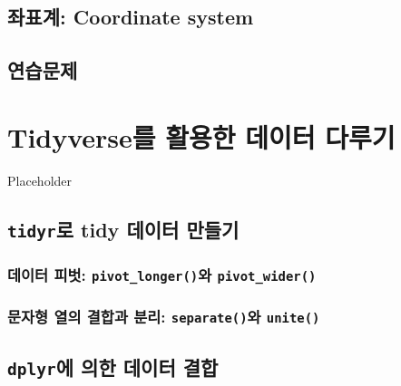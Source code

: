 \documentclass[
]{book}
\begin{document}
\hypertarget{uxc88cuxd45cuxacc4-coordinate-system}{%
\section{좌표계: Coordinate system}\label{uxc88cuxd45cuxacc4-coordinate-system}}

\hypertarget{uxc5f0uxc2b5uxbb38uxc81c-3}{%
\section{연습문제}\label{uxc5f0uxc2b5uxbb38uxc81c-3}}

\hypertarget{ch6}{%
\chapter{Tidyverse를 활용한 데이터 다루기}\label{ch6}}

Placeholder

\hypertarget{tidyruxb85c-tidy-uxb370uxc774uxd130-uxb9ccuxb4e4uxae30}{%
\section{\texorpdfstring{\texttt{tidyr}로 tidy 데이터 만들기}{tidyr로 tidy 데이터 만들기}}\label{tidyruxb85c-tidy-uxb370uxc774uxd130-uxb9ccuxb4e4uxae30}}

\hypertarget{uxb370uxc774uxd130-uxd53cuxbc97-pivot_longeruxc640-pivot_wider}{%
\subsection{\texorpdfstring{데이터 피벗: \texttt{pivot\_longer()}와 \texttt{pivot\_wider()}}{데이터 피벗: pivot\_longer()와 pivot\_wider()}}\label{uxb370uxc774uxd130-uxd53cuxbc97-pivot_longeruxc640-pivot_wider}}

\hypertarget{uxbb38uxc790uxd615-uxc5f4uxc758-uxacb0uxd569uxacfc-uxbd84uxb9ac-separateuxc640-unite}{%
\subsection{\texorpdfstring{문자형 열의 결합과 분리: \texttt{separate()}와 \texttt{unite()}}{문자형 열의 결합과 분리: separate()와 unite()}}\label{uxbb38uxc790uxd615-uxc5f4uxc758-uxacb0uxd569uxacfc-uxbd84uxb9ac-separateuxc640-unite}}

\hypertarget{dplyruxc5d0-uxc758uxd55c-uxb370uxc774uxd130-uxacb0uxd569}{%
\section{\texorpdfstring{\texttt{dplyr}에 의한 데이터 결합}{dplyr에 의한 데이터 결합}}\label{dplyruxc5d0-uxc758uxd55c-uxb370uxc774uxd130-uxacb0uxd569}}
\end{document}
